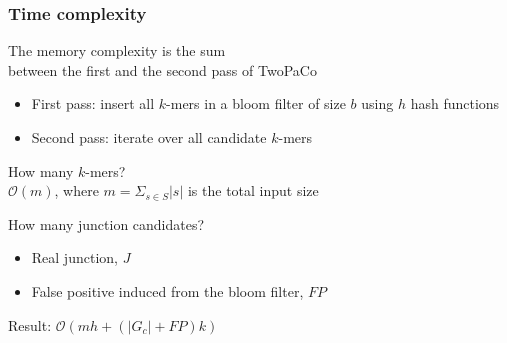 \begin{frame}
  
	\frametitle{Time complexity}

  \centering
	
	The memory complexity is the sum \\ between the first and the second pass of TwoPaCo \\
	
	\bigskip
	
	\begin{itemize}
	  \item First pass: insert all $k$-mers in a bloom filter of size $b$ using $h$ hash functions
	  \item Second pass: iterate over all candidate $k$-mers
	\end{itemize}
	
	\bigskip
	
	How many $k$-mers? \\
	
	$\mathcal{O}(m)$, where $m = \Sigma_{s \in S}{ |s| }$ is the total input size
	
	\bigskip
	 
	How many junction candidates?
	
	\begin{itemize}
	  \item Real junction, $J$
	  \item False positive induced from the bloom filter, $FP$
	\end{itemize}

	\medskip
	
	Result: $\mathcal{O}(mh + (|G_{c}| + FP)k)$
	
	
\end{frame}



